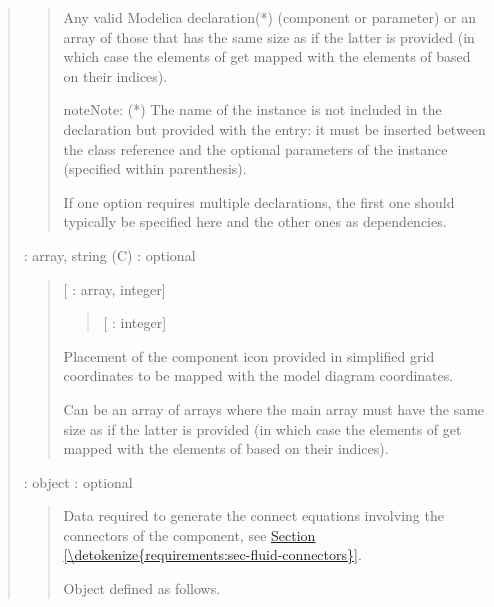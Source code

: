 \documentclass[letterpaper,10pt, openany,english]{sphinxmanual}
\begin{document}
\begin{quote}
\begin{quote}
Any valid Modelica declaration(*) (component or parameter) or an array of those that has the same size as  if the latter is provided (in which case the elements of  get mapped with the elements of  based on their indices).

\begin{sphinxadmonition}{note}{Note:}
(*) The name of the instance is not included in the declaration but provided with the  entry: it must be inserted between the class reference and the optional parameters of the instance (specified within parenthesis).

If one option requires multiple declarations, the first one should typically be specified here and the other ones as dependencies.
\end{sphinxadmonition}
\end{quote}

 : array, string (C) : optional
\begin{quote}

{[} : array, integer{]}
\begin{quote}

{[} : integer{]}
\end{quote}

\begin{DUlineblock}{0em}
\item[] Placement of the component icon provided in simplified grid coordinates  to be mapped with the model diagram coordinates.
\item[] Can be an array of arrays where the main array must have the same size as  if the latter is provided (in which case the elements of  get mapped with the elements of  based on their indices).
\end{DUlineblock}
\end{quote}

 : object : optional
\begin{quote}

\begin{DUlineblock}{0em}
\item[] Data required to generate the connect equations involving the connectors of the component, see \hyperref[\detokenize{requirements:sec-fluid-connectors}]{Section \ref{\detokenize{requirements:sec-fluid-connectors}}}.
\item[] Object defined as follows.
\end{DUlineblock}


\end{quote}
\end{quote}
\end{document}
